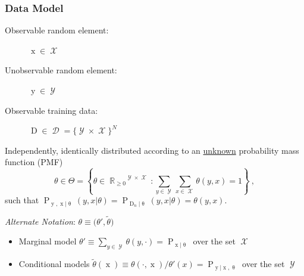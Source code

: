 \documentclass{beamer}
\DeclareMathOperator{\xrm}{\mathrm{x}}
\DeclareMathOperator{\yrm}{\mathrm{y}}
\DeclareMathOperator{\Drm}{\mathrm{D}}
\DeclareMathOperator{\Prm}{\mathrm{P}}
\DeclareMathOperator{\Xcal}{\mathcal{X}}
\DeclareMathOperator{\Ycal}{\mathcal{Y}}
\DeclareMathOperator{\Dcal}{\mathcal{D}}
\DeclareMathOperator{\Rbb}{\mathbb{R}}
\begin{document}
\begin{frame}
\frametitle{Data Model}

\begin{description}
\item[Observable random element:] $\xrm \in \Xcal$
\item[Unobservable random element:] $\yrm \in \Ycal$
\item[Observable training data:] $\Drm \in \Dcal = \{\Ycal \times \Xcal\}^N$
\end{description}

\vspace{0.5em}

Independently, identically distributed according to an \underline{unknown} probability mass function (PMF) 
\begin{equation*}
\theta \in \Theta = \left\{ \theta \in {\Rbb_{\geq 0}}^{\Ycal \times \Xcal}: \sum_{y \in \Ycal} \sum_{x \in \Xcal} \theta(y,x) = 1 \right\} \ ,
\end{equation*}
such that $\Prm_{\yrm,\xrm | \uptheta}(y,x | \theta) = \Prm_{\Drm_n | \uptheta}(y,x | \theta) = \theta(y,x)$.

\hrulefill

\vspace{0.5em}
\textit{Alternate Notation}: $\theta \equiv \big( \theta',\tilde{\theta} \big)$
\begin{itemize}
\item Marginal model $\theta' \equiv \sum_{y \in \Ycal} \theta(y,\cdot) = \Prm_{\xrm | \uptheta}$ over the set $\Xcal$ 
\item Conditional models $\tilde{\theta}(\xrm) \equiv \theta(\cdot,\xrm) / \theta'(x) = \Prm_{\yrm | \xrm,\uptheta}$ over the set $\Ycal$
\end{itemize}


\end{frame}
\end{document}
